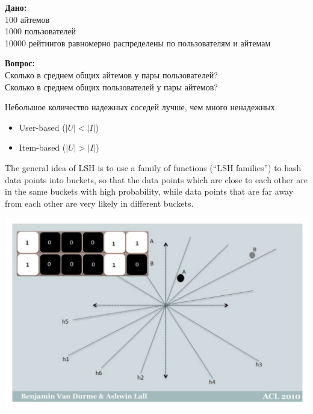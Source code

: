 \documentclass[11pt,aspectratio=169]{beamer}
\begin{document}
\begin{frame}

{\bf Дано:} \\
100 айтемов \\
1000 пользователей \\
10000 рейтингов равномерно распределены по пользователям и айтемам \\

\vfill

{\bf Вопрос:} \\
Сколько в среднем общих айтемов у пары пользователей? \\
Сколько в среднем общих пользователей у пары айтемов? \\

\vfill

\begin{tcolorbox}[colback=gray!5,colframe=gray!80,title=]
Небольшое количество надежных соседей лучше, чем много ненадежных
\begin{itemize}
\item User-based ($|U| < |I|$)
\item Item-based  ($|U| > |I|$)
\end{itemize}
\end{tcolorbox}

\end{frame}

\begin{frame}

\begin{tcolorbox}[colback=gray!5,colframe=gray!80,title=Locality-Sensitive Hashing для приближенного поиска соседей]
The general idea of LSH is to use a family of functions (“LSH families”) to hash data points into buckets, so that the data points which are close to each other are in the same buckets with high probability, while data points that are far away from each other are very likely in different buckets.
\end{tcolorbox}

\begin{center}
\includegraphics[scale=0.2]{images/lsh.png}
\end{center}

\end{frame}
\end{document}
